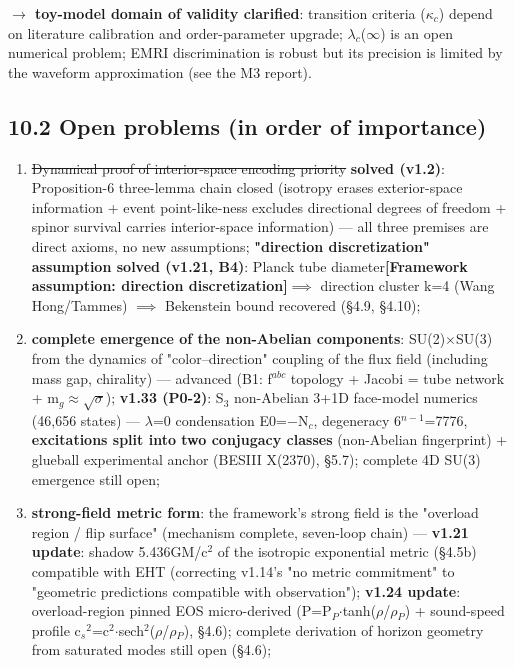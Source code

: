 \documentclass[12pt]{article}
\newcommand{\mtag}[1]{\textbf{[#1]}}
\newcommand{\up}[1]{\ensuremath{^{#1}}}
\newcommand{\down}[1]{\ensuremath{_{#1}}}
\begin{document}
\textbf{\ensuremath{\to} toy-model domain of validity clarified}: transition criteria (\ensuremath{\kappa}\down{c}) depend on literature calibration and order-parameter upgrade; \ensuremath{\lambda}\down{c}(\ensuremath{\infty}) is an open numerical problem; EMRI discrimination is robust but its precision is limited by the waveform approximation (see the M3 report).

\subsection{10.2 Open problems (in order of importance)}

\begin{enumerate}
\item \sout{Dynamical proof of interior-space encoding priority} \textbf{\checkmark solved (v1.2)}: Proposition-6 three-lemma chain closed (isotropy erases exterior-space information + event point-like-ness excludes directional degrees of freedom + spinor survival carries interior-space information) --- all three premises are direct axioms, no new assumptions; \textbf{"direction discretization" assumption \checkmark solved (v1.21, B4)}: Planck tube diameter\mtag{Framework assumption: direction discretization}\ensuremath{\implies} direction cluster k=4 (Wang Hong/Tammes) \ensuremath{\implies} Bekenstein bound recovered (\S{}4.9, \S{}4.10);
\item \textbf{complete emergence of the non-Abelian components}: SU(2)\ensuremath{\times}SU(3) from the dynamics of "color--direction" coupling of the flux field (including mass gap, chirality) --- \checkmark advanced (B1: f\up{abc} topology + Jacobi = tube network + m\down{g}\ensuremath{\approx}\ensuremath{\sqrt{\sigma{}}}); \textbf{v1.33 (P0-2)}: S\down{3} non-Abelian 3+1D face-model numerics (46,656 states) --- \ensuremath{\lambda}=0 condensation E0=\ensuremath{-}N\down{c}, degeneracy 6\up{n-1}=7776, \textbf{excitations split into two conjugacy classes} (non-Abelian fingerprint) + glueball experimental anchor (BESIII X(2370), \S{}5.7); complete 4D SU(3) emergence still open;
\item \textbf{strong-field metric form}: the framework's strong field is the "overload region / flip surface" (mechanism complete, seven-loop chain) --- \textbf{v1.21 update}: shadow 5.436GM/c\up{2} of the isotropic exponential metric (\S{}4.5b) compatible with EHT (correcting v1.14's "no metric commitment" to "geometric predictions compatible with observation"); \textbf{v1.24 update}: overload-region pinned EOS micro-derived (P=P\down{P}\ensuremath{\cdot}tanh(\ensuremath{\rho}/\ensuremath{\rho}\down{P}) + sound-speed profile c\down{s}\up{2}=c\up{2}\ensuremath{\cdot}sech\up{2}(\ensuremath{\rho}/\ensuremath{\rho}\down{P}), \S{}4.6); complete derivation of horizon geometry from saturated modes still open (\S{}4.6);

\end{enumerate}
\end{document}
